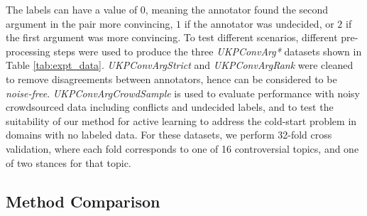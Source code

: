 The labels can have a value of $0$, meaning the annotator found the second argument in the pair more convincing,
$1$ if the annotator was undecided, or $2$ if the first argument was more convincing.
To test different scenarios, different pre-processing steps were used to produce the
three \emph{UKPConvArg*} datasets shown in Table \ref{tab:expt_data}.
\emph{UKPConvArgStrict} and \emph{UKPConvArgRank} were cleaned to remove disagreements between annotators, hence can be considered to be \emph{noise-free}.
 \emph{UKPConvArgCrowdSample} is used to evaluate performance with noisy crowdsourced data 
including conflicts and undecided labels, and to test the suitability of our method for active learning
to address the cold-start problem in domains with no labeled data.
For these datasets, we perform 32-fold cross validation, where
each fold corresponds to one of 16 controversial topics, and one of two stances for that topic.
 
\subsection{Method Comparison}

